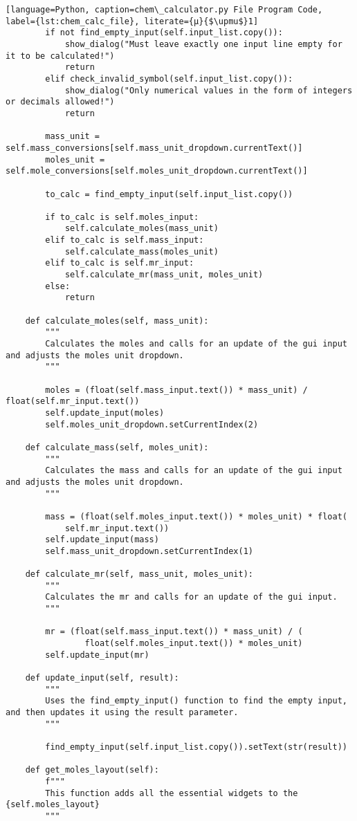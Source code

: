 \begin{lstlisting}[language=Python, caption=chem\_calculator.py File Program Code, label={lst:chem_calc_file}, literate={μ}{$\upmu$}1]
        if not find_empty_input(self.input_list.copy()):
            show_dialog("Must leave exactly one input line empty for it to be calculated!")
            return
        elif check_invalid_symbol(self.input_list.copy()):
            show_dialog("Only numerical values in the form of integers or decimals allowed!")
            return

        mass_unit = self.mass_conversions[self.mass_unit_dropdown.currentText()]
        moles_unit = self.mole_conversions[self.moles_unit_dropdown.currentText()]

        to_calc = find_empty_input(self.input_list.copy())

        if to_calc is self.moles_input:
            self.calculate_moles(mass_unit)
        elif to_calc is self.mass_input:
            self.calculate_mass(moles_unit)
        elif to_calc is self.mr_input:
            self.calculate_mr(mass_unit, moles_unit)
        else:
            return

    def calculate_moles(self, mass_unit):
        """
        Calculates the moles and calls for an update of the gui input and adjusts the moles unit dropdown.
        """

        moles = (float(self.mass_input.text()) * mass_unit) / float(self.mr_input.text())
        self.update_input(moles)
        self.moles_unit_dropdown.setCurrentIndex(2)

    def calculate_mass(self, moles_unit):
        """
        Calculates the mass and calls for an update of the gui input and adjusts the moles unit dropdown.
        """

        mass = (float(self.moles_input.text()) * moles_unit) * float(
            self.mr_input.text())
        self.update_input(mass)
        self.mass_unit_dropdown.setCurrentIndex(1)

    def calculate_mr(self, mass_unit, moles_unit):
        """
        Calculates the mr and calls for an update of the gui input.
        """

        mr = (float(self.mass_input.text()) * mass_unit) / (
                float(self.moles_input.text()) * moles_unit)
        self.update_input(mr)

    def update_input(self, result):
        """
        Uses the find_empty_input() function to find the empty input, and then updates it using the result parameter.
        """

        find_empty_input(self.input_list.copy()).setText(str(result))

    def get_moles_layout(self):
        f"""
        This function adds all the essential widgets to the {self.moles_layout} 
        """


\end{lstlisting}
